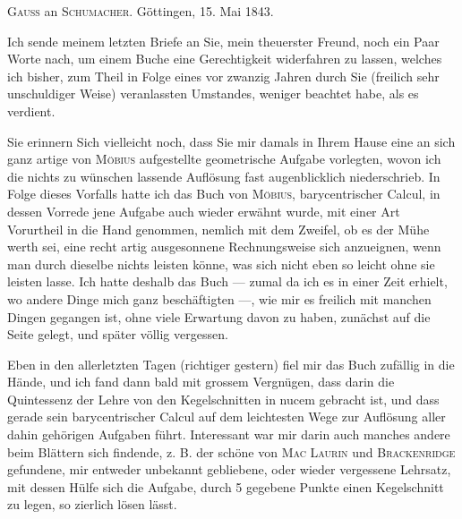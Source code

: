 \begin{center}\textsc{Gauss} an \textsc{Schumacher}. Göttingen, 15. Mai 1843.\end{center}

Ich sende meinem letzten Briefe an Sie, mein theuerster Freund, noch ein Paar Worte
nach, um einem Buche eine Gerechtigkeit widerfahren zu lassen, welches ich bisher, zum
Theil in Folge eines vor zwanzig Jahren durch Sie (freilich sehr unschuldiger Weise)
veranlassten Umstandes, weniger beachtet habe, als es verdient.

Sie erinnern Sich vielleicht noch, dass Sie mir damals in Ihrem Hause eine an sich
ganz artige von \textsc{Möbius} aufgestellte geometrische Aufgabe vorlegten, wovon ich
die nichts zu wünschen lassende Auflösung fast augenblicklich niederschrieb. In Folge
dieses Vorfalls hatte ich das Buch von \textsc{Möbius}, barycentrischer Calcul, in
dessen Vorrede jene Aufgabe auch wieder erwähnt wurde, mit einer Art Vorurtheil in die
Hand genommen, nemlich mit dem Zweifel, ob es der Mühe werth sei, eine recht artig
ausgesonnene Rechnungsweise sich anzueignen, wenn man durch dieselbe nichts leisten
könne, was sich nicht eben so leicht ohne sie leisten lasse. Ich hatte deshalb das
Buch --- zumal da ich es in einer Zeit erhielt, wo andere Dinge mich ganz
beschäftigten ---, wie mir es freilich mit manchen Dingen gegangen ist, ohne viele
Erwartung davon zu haben, zunächst auf die Seite gelegt, und später völlig vergessen.

Eben in den allerletzten Tagen (richtiger gestern) fiel mir das Buch zufällig in die
Hände, und ich fand dann bald mit grossem Vergnügen, dass darin die Quintessenz der
Lehre von den Kegelschnitten in nucem gebracht ist, und dass gerade sein
barycentrischer Calcul auf dem leichtesten Wege zur Auflösung aller dahin gehörigen
Aufgaben führt. Interessant war mir darin auch manches andere beim Blättern sich
findende, z. B. der schöne von \textsc{Mac Laurin} und \textsc{Brackenridge}
gefundene, mir entweder unbekannt gebliebene, oder wieder vergessene Lehrsatz, mit
dessen Hülfe sich die Aufgabe, durch 5 gegebene Punkte einen Kegelschnitt zu legen, so
zierlich lösen lässt.
